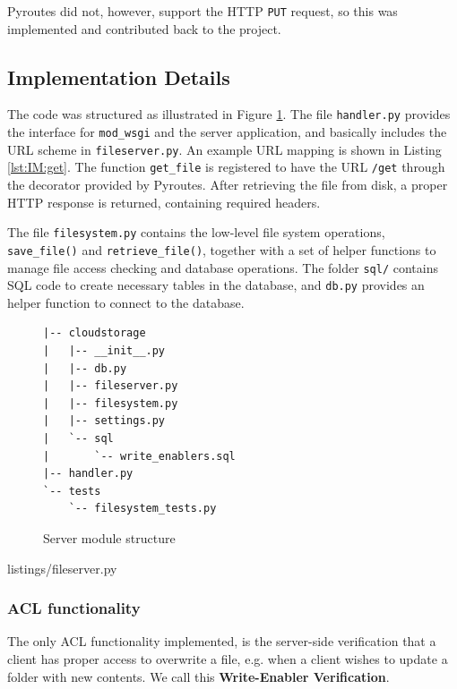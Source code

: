 \documentclass[pdftex,english,10pt,b5paper,twoside]{book}
\begin{document}
Pyroutes did not, however, support the HTTP \texttt{PUT} request, so this was
implemented and contributed back to the project.

\subsection{Implementation Details}

The code was structured as illustrated in Figure \ref{fig:IM:layout}. The file
\texttt{handler.py} provides the interface for \texttt{mod\_wsgi} and the server
application, and basically includes the \ac{URL} scheme in
\texttt{fileserver.py}. An example \ac{URL} mapping is shown in Listing
\ref{lst:IM:get}. The function \texttt{get\_file} is registered to have the
\ac{URL} \texttt{/get} through the decorator provided by Pyroutes. After
retrieving the file from disk, a proper \ac{HTTP} response is returned,
containing required headers.

The file \texttt{filesystem.py} contains the low-level file system operations,
\texttt{save\_file()} and \texttt{retrieve\_file()}, together with a set of
helper functions to manage file access checking and database operations.  The
folder \texttt{sql/} contains \ac{SQL} code to create necessary tables in the
database, and \texttt{db.py} provides an helper function to connect to the
database.

\begin{figure}[h!]
\begin{verbatim}
|-- cloudstorage
|   |-- __init__.py
|   |-- db.py
|   |-- fileserver.py
|   |-- filesystem.py
|   |-- settings.py
|   `-- sql
|       `-- write_enablers.sql
|-- handler.py
`-- tests
    `-- filesystem_tests.py
\end{verbatim}
    \caption{Server module structure}
    \label{fig:IM:layout}
\end{figure}


{listings/fileserver.py}

\subsubsection{\acs{ACL} functionality}

The only \ac{ACL} functionality implemented, is the server-side verification
that a client has proper access to overwrite a file, e.g. when a client wishes
to update a folder with new contents. We call this \textbf{Write-Enabler
Verification}.
\end{document}
